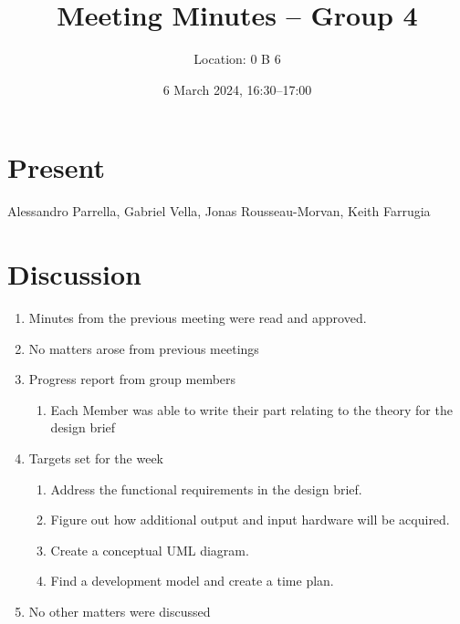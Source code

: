 \documentclass{cce2014-meetings}
\title{Meeting Minutes -- Group 4}
\author{Location: 0 B 6}
\date{6 March 2024, 16:30--17:00}
\begin{document}
\maketitle

\section*{Present}
Alessandro Parrella,
Gabriel Vella,
Jonas Rousseau-Morvan,
Keith Farrugia

\section*{Discussion}

\begin{enumerate}


      \item Minutes from the previous meeting were read and approved.

      \item No matters arose from previous meetings

      \item Progress report from group members
            \begin{enumerate}
                  \item Each Member was able to write their part relating to the theory for the design brief
            \end{enumerate}

      \item Targets set for the week
            \begin{enumerate}
                  \item Address the functional requirements in the design brief. 
                  \item Figure out how additional output and input hardware will be acquired.
                  \item Create a conceptual UML diagram. 
                  \item Find a development model and create a time plan.
            \end{enumerate}
            
      \item No other matters were discussed
\end{enumerate}
\end{document}

